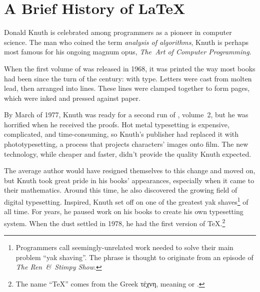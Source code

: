 \chapter{A Brief History of \texorpdfstring{\LaTeX}{LaTeX}}

\label{history}

Donald Knuth is celebrated among programmers as
a pioneer in computer science.
The man who coined the term \emph{analysis of algorithms},
Knuth is perhaps most famous for his ongoing magnum opus,
\textit{The~Art of Computer Programming}.

When the first volume of  was released in 1968,
it was printed the way most books had been since the turn of the century:
with  type.
Letters were cast from molten lead,
then arranged into lines.
These lines were clamped together to form pages,
which were inked and pressed against paper.

By March of 1977, Knuth was ready for a second run of , volume~2,
but he was horrified when he received the proofs.
Hot metal typesetting is expensive, complicated, and time-consuming,
so Knuth's publisher had replaced it with phototypesetting,
a process that projects characters' images onto film.
The new technology, while cheaper and faster,
didn't provide the quality Knuth
expected.\punckern{}

The average author would have resigned themselves to this change and moved on,
but Knuth took great pride in his books' appearances,
especially when it came to their mathematics.
Around this time, he also discovered the growing field of digital typesetting.
Inspired,
Knuth set off on one of the greatest yak shaves\footnote{Programmers
call seemingly-unrelated work needed to solve their main problem
``yak shaving''\quotekern. The phrase is thought to originate from an episode
of \textit{The Ren~\&~Stimpy Show}.\punckern{}}
of all time.
For years, he paused work on his books to create his own
typesetting system.
When the dust settled in 1978, he had the first version of
\TeX.\punckern\footnote{The name ``\TeX{}'' comes from the Greek
{τέχνη},
meaning  or .\punckern{}}

